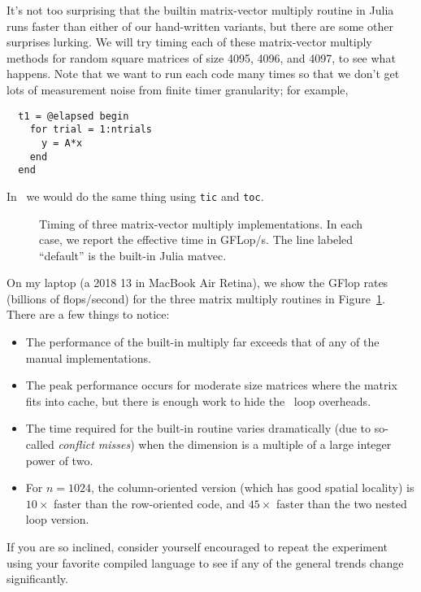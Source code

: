 \documentclass[12pt, leqno]{article}
\begin{document}
It's not too surprising that the builtin matrix-vector multiply routine in
Julia runs faster than either of our hand-written variants, but there
are some other surprises lurking.  We will try timing each of these
matrix-vector multiply methods for random square matrices of
size 4095, 4096, and 4097, to see what happens.  Note that we want to
run each code many times so that we don't get lots of measurement
noise from finite timer granularity; for example,
\begin{lstlisting}
  t1 = @elapsed begin
    for trial = 1:ntrials
      y = A*x
    end
  end  
\end{lstlisting}
In \matlab\ we would do the same thing using {\tt tic} and {\tt toc}.

\begin{figure} \label{fig:matvec-time}
  \caption{Timing of three matrix-vector multiply implementations.
    In each case, we report the effective time in GFLop/s.
    The line labeled ``default'' is the built-in Julia matvec.}
\end{figure}

On my laptop (a 2018 13 in MacBook Air Retina),
we show the GFlop rates (billions of flops/second)
for the three matrix multiply routines in Figure~\ref{fig:matvec-time}.
There are a few things to notice:
\begin{itemize}
\item The performance of the built-in multiply far exceeds that
  of any of the manual implementations.
\item The peak performance occurs for moderate size matrices where
  the matrix fits into cache, but there is enough work to hide
  the \matlab\ loop overheads.
\item The time required for the built-in routine varies dramatically
  (due to so-called {\em conflict misses}) when the dimension is
  a multiple of a large integer power of two.
\item For $n = 1024$, the column-oriented version (which has good spatial
  locality) is $10\times$ faster than the row-oriented code,
  and $45\times$ faster than the two nested loop version.
\end{itemize}
If you are so inclined, consider yourself encouraged to repeat the
experiment using your favorite compiled language to see if any of the
general trends change significantly.
\end{document}
